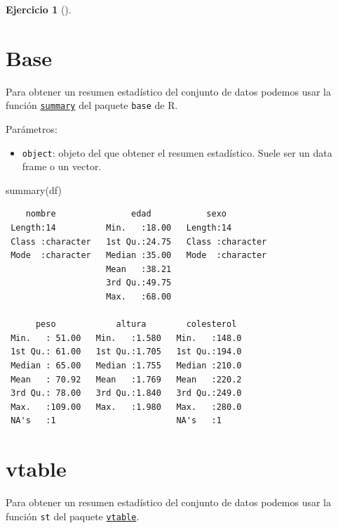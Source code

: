 \documentclass[
  a4paper,
]{scrreport}
\newenvironment{Shaded}{\begin{snugshade}}{\end{snugshade}}
\newcommand{\FunctionTok}[1]{\textcolor[rgb]{0.28,0.35,0.67}{#1}}
\newcommand{\NormalTok}[1]{\textcolor[rgb]{0.00,0.23,0.31}{#1}}
\providecommand{\tightlist}{%
  \setlength{\itemsep}{0pt}\setlength{\parskip}{0pt}}\usepackage{longtable,booktabs,array}
\theoremstyle{definition}
\newtheorem{exercise}{Ejercicio}[chapter]
\theoremstyle{remark}
\begin{document}
\begin{exercise}[]
\begin{enumerate}
\begin{tcolorbox}
  \section{Base}

  Para obtener un resumen estadístico del conjunto de datos podemos usar
  la función
  \href{https://www.rdocumentation.org/packages/base/versions/3.6.2/topics/summary}{\texttt{summary}}
  del paquete \texttt{base} de R.

  Parámetros:

  \begin{itemize}
  \tightlist
  \item
    \texttt{object}: objeto del que obtener el resumen estadístico.
    Suele ser un data frame o un vector.
  \end{itemize}

\begin{Shaded}
\begin{Highlighting}[]
\FunctionTok{summary}\NormalTok{(df)}
\end{Highlighting}
\end{Shaded}

\begin{verbatim}
    nombre               edad           sexo          
 Length:14          Min.   :18.00   Length:14         
 Class :character   1st Qu.:24.75   Class :character  
 Mode  :character   Median :35.00   Mode  :character  
                    Mean   :38.21                     
                    3rd Qu.:49.75                     
                    Max.   :68.00                     

      peso            altura        colesterol   
 Min.   : 51.00   Min.   :1.580   Min.   :148.0  
 1st Qu.: 61.00   1st Qu.:1.705   1st Qu.:194.0  
 Median : 65.00   Median :1.755   Median :210.0  
 Mean   : 70.92   Mean   :1.769   Mean   :220.2  
 3rd Qu.: 78.00   3rd Qu.:1.840   3rd Qu.:249.0  
 Max.   :109.00   Max.   :1.980   Max.   :280.0  
 NA's   :1                        NA's   :1      
\end{verbatim}

  \section{vtable}

  Para obtener un resumen estadístico del conjunto de datos podemos usar
  la función \texttt{st} del paquete
  \href{https://cran.r-project.org/web/packages/vtable/vignettes/sumtable.html}{\texttt{vtable}}.


\end{tcolorbox}
\end{enumerate}
\end{exercise}
\end{document}

